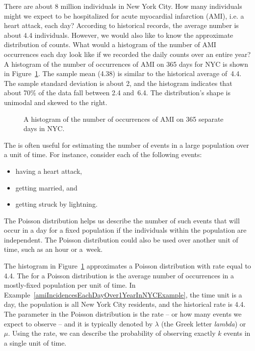 \begin{examplewrap}
\begin{nexample}{There are about 8 million individuals
    in New York City.
    How many individuals might we expect to be hospitalized
    for acute myocardial infarction (AMI), i.e. a heart attack,
    each day?
    According to historical records, the average number is
    about 4.4 individuals.
    However, we would also like to know the approximate
    distribution of counts.
    What would a histogram of the number of AMI occurrences
    each day look like if we recorded the daily counts over
    an entire year?}
  \label{amiIncidencesEachDayOver1YearInNYCExample}%
  A histogram of the number of occurrences of AMI on 365 days
  for NYC is shown in
  Figure~\ref{amiIncidencesOver100Days}.\footnotemark{}
  The sample mean (4.38) is similar to the historical average
  of~4.4.
  The sample standard deviation is about 2, and the histogram
  indicates that about 70\% of the data fall between 2.4 and~6.4.
  The distribution's shape is unimodal and skewed to the right.
\end{nexample}
\end{examplewrap}

\begin{figure}[h]
  \centering
  \caption{A histogram of the number of occurrences
      of AMI on 365 separate days in NYC.}
  \label{amiIncidencesOver100Days}
\end{figure}

The  is often useful for estimating the number of events in a large population over a unit of time. For instance, consider each of the following events:
\begin{itemize}
\setlength{\itemsep}{0mm}
\item having a heart attack,
\item getting married, and
\item getting struck by lightning.
\end{itemize}
The Poisson distribution helps us describe the number of such events that will occur in a day for a fixed population if the individuals within the population are independent. The Poisson distribution could also be used over another unit of time, such as an hour or a~week.

The histogram in Figure~\ref{amiIncidencesOver100Days} approximates a Poisson distribution with rate equal to 4.4. The  for a Poisson distribution is the average number of occurrences in a mostly-fixed population per unit of time. In Example~\ref{amiIncidencesEachDayOver1YearInNYCExample}, the time unit is a day, the population is all New York City residents, and the historical rate is 4.4. The parameter in the Poisson distribution is the rate -- or how many events we expect to observe -- and it is typically denoted by $\lambda$
(the Greek letter \emph{lambda})  or $\mu$. Using the rate, we can describe the probability of observing exactly $k$ events in a single unit of time.

